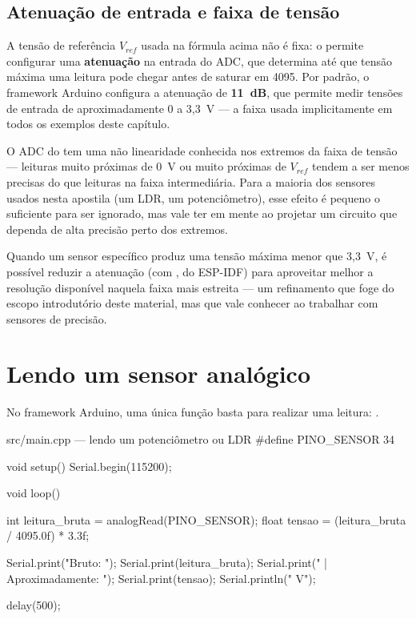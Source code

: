 \subsection{Atenuação de entrada e faixa de tensão}

A tensão de referência $V_{ref}$ usada na fórmula acima não é fixa: o \ESP{} permite configurar uma \textbf{atenuação} na entrada do ADC, que determina até que tensão máxima uma leitura pode chegar antes de saturar em 4095. Por padrão, o framework Arduino configura a atenuação de \textbf{11~dB}, que permite medir tensões de entrada de aproximadamente 0 a 3,3~V — a faixa usada implicitamente em todos os exemplos deste capítulo.

\begin{atencao}
O ADC do \ESP{} tem uma não linearidade conhecida nos extremos da faixa de tensão — leituras muito próximas de 0~V ou muito próximas de $V_{ref}$ tendem a ser menos precisas do que leituras na faixa intermediária. Para a maioria dos sensores usados nesta apostila (um LDR, um potenciômetro), esse efeito é pequeno o suficiente para ser ignorado, mas vale ter em mente ao projetar um circuito que dependa de alta precisão perto dos extremos.
\end{atencao}

Quando um sensor específico produz uma tensão máxima menor que 3,3~V, é possível reduzir a atenuação (com , do ESP-IDF) para aproveitar melhor a resolução disponível naquela faixa mais estreita — um refinamento que foge do escopo introdutório deste material, mas que vale conhecer ao trabalhar com sensores de precisão.

\section{Lendo um sensor analógico}

No framework Arduino, uma única função basta para realizar uma leitura: .

\begin{codigoc}{src/main.cpp — lendo um potenciômetro ou LDR}
#define PINO_SENSOR 34

void setup() {
    Serial.begin(115200);
}

void loop() {
    int leitura_bruta = analogRead(PINO_SENSOR);
    float tensao = (leitura_bruta / 4095.0f) * 3.3f;

    Serial.print("Bruto: ");
    Serial.print(leitura_bruta);
    Serial.print("  |  Aproximadamente: ");
    Serial.print(tensao);
    Serial.println(" V");

    delay(500);
}
\end{codigoc}

